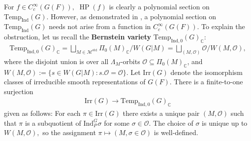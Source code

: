 \documentclass[10pt]{amsart}
\theoremstyle{definition}
\numberwithin{equation}{section}
\numberwithin{equation}{subsection}
\newcommand{\Ind}{\mathrm{Ind}}
\newcommand{\CC}{\mathbb{C}}
\newcommand{\calO}{\mathcal{O}}
\newcommand{\Temp}{\mathrm{Temp}}
\newcommand{\HP}{\mathop{\mathrm{HP}}\nolimits}
\begin{document}
For $f\in C^\infty_c(G(F)),$ $\HP(f)$ is clearly a polynomial section on $\Temp_\Ind(G)$. However, as demonstrated in \cite[Example 6.2]{DRS}, a polynomial section on $\Temp_\Ind(G)$ needs not arise from a function in $C_c^\infty(G(F)).$ To explain the obstruction, let us recall the \textbf{Bernstein variety}  $\Temp_{\Ind,0}(G)_\CC:$
\begin{align*}
    \Temp_{\Ind,0}(G)_\CC = \bigsqcup\limits_{M\in\mathcal{M}^{\mathrm{std}}} \Pi_0(M)_\CC / W(G|M) = \bigsqcup\limits_{(M,\mathcal{O})} \mathcal{O}/ W(M,\mathcal{O}),
\end{align*}
where the disjoint union is over all $\Lambda_M$-orbits $\mathcal{O}\subseteq \Pi_0(M)_\CC$, and $W(M,\mathcal{O}):= \{s\in W(G|M): s.\mathcal{O}=\mathcal{O}\}$. Let $\mathrm{Irr}(G)$ denote the isomorphism classes of irreducible smooth representations of $G(F)$. There is a finite-to-one surjection
\begin{align*}
    \mathrm{Irr}(G)\longrightarrow \Temp_{\Ind,0}(G)_\CC
\end{align*}
given as follows: For each $\pi\in\mathrm{Irr}(G)$ there exists a unique pair $(M,\mathcal{O})$ such that $\pi$ is a subquotient of $\Ind_P^G\sigma$ for some $\sigma\in \mathcal{O}$. The choice of $\sigma$ is unique up to $W(M,\calO),$ so the assignment $\pi\mapsto (M,\sigma\in \mathcal{O})$ is well-defined.

\end{document}
